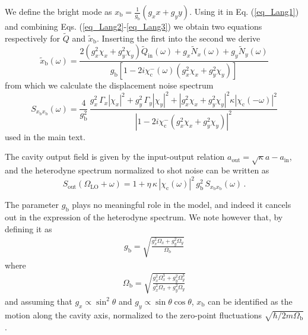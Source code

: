\documentclass[11pt,floatfix,amssymb,prx,aps,longbibliography,superscriptaddress,nopacs]{revtex4-2}
\newcommand{\om}{\left( \omega \right)}
\newcommand{\tNx}{\tilde{N}_x\left(\omega\right)}
\newcommand{\tNy}{\tilde{N}_y\left(\omega\right)}
\newcommand{\ccm}{\chi_\mathrm{c}^-\left(\omega\right)}
\newcommand{\GY}{\Gamma_{\scriptstyle{y}}}
\newcommand{\GX}{\Gamma_{\scriptstyle{x}}}
\newcommand{\gX}{g_{\scriptstyle{x}}}
\newcommand{\gY}{g_{\scriptstyle{y}}}
\newcommand{\gb}{g_{\mathrm{b}}}
\begin{document}
We define the bright mode as  $x_\mathrm{b} = \frac{1}{g_\mathrm{b}}\left(\gX x+ \gY y\right)$. Using it in Eq. (\ref{eq_Lang1}) and combining Eqs. (\ref{eq_Lang2}-\ref{eq_Lang3}) we obtain two equations respectively for $\tilde{Q}$ and $\tilde{x}_{\mathrm{b}}$. Inserting the first into the second we derive 
\begin{equation}
   \tilde{x}_\mathrm{b} \left( \omega \right)=\frac{2\left(\gX^2\chi_x +\gY^2 \chi_y \right) \tilde{Q}_\mathrm{in}  \left(\omega\right) +\gX \tNx + \gY \tNy}{g_\mathrm{b}\left[1-2 i \ccm \left( \gX^2 \chi_x + \gY^2 \chi_y \right) \right]}
\end{equation}
from which we calculate the displacement noise spectrum
\begin{equation}
S_{x_\mathrm{b} x_\mathrm{b}}\om=\frac{4}{\gb^2}\,
\frac{\gX^2 \,\GX \left|\chi_x\right|^2
+\gY^2 \,\GY\left|\chi_y\right|^2+\left|\gX^2 \chi_x+\gY^2 \chi_y\right|^2
\kappa \left|\chi_\mathrm{c}\left(-\omega\right)\right|^2}
{\left|1-2 i \chi_\mathrm{c}^{-}\left(\gX^2 \chi_x+\gY^2 \chi_y\right)\right|^2}
\end{equation}
used in the main text.

The cavity output field is given by the input-output relation 
$a_{\mathrm{out}} = \sqrt{\kappa} a-a_{\mathrm{in}}$, and
the heterodyne spectrum normalized to shot noise can be written as
\begin{equation}
S_{\mathrm{out}}(\Omega_{\mathrm{LO}}+\omega) 
= 1 + \eta  \,\kappa \,\left|\chi_\mathrm{c}\left(\omega\right)\right|^2 \,\gb^2 \, S_{x_\mathrm{b} x_\mathrm{b}}\om  \, .
\end{equation}

The parameter $g_{\mathrm{b}}$ plays no meaningful role in the model, and indeed it cancels out in the expression of the heterodyne spectrum. We note however that, by defining it as 
\begin{gather}
g_\mathrm{b}=\sqrt{\frac{\gX^2\Omega_x+\gY ^2 \Omega_y}{\Omega_{\mathrm{b}}}}
\end{gather}
where
\begin{gather}
\Omega_{\mathrm{b}}=\sqrt{\frac{\gX^2 \Omega_{x}^3+\gY^2 \Omega_{y}^3}{\gX^2\Omega_{x}+\gY^2 \Omega_{y}}} 
\label{eq_Omegab}
\end{gather}
and assuming that $\gX \propto \sin^2 \theta$ and $\gY \propto \sin \theta \cos \theta$, $x_{\mathrm{b}}$ can be identified as the motion along the cavity axis, normalized to the zero-point fluctuations $\sqrt{\hbar/2 m \Omega_{\mathrm{b}}}$.
\end{document}
